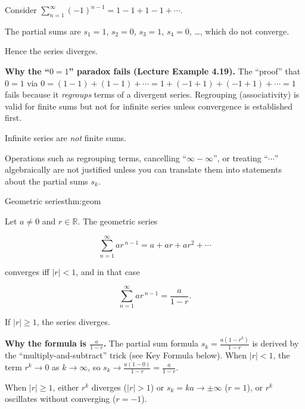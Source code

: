 \begin{examplebox}[title={Worked Example: a divergent series with oscillating partial sums}]

Consider $\displaystyle \sum_{n=1}^{\infty}(-1)^{n-1}=1-1+1-1+\cdots$.

The partial sums are $s_1=1$, $s_2=0$, $s_3=1$, $s_4=0$, \dots, which do not converge.

Hence the series diverges.

\end{examplebox}

\noindent
\textbf{Why the ``$0=1$'' paradox fails (Lecture Example 4.19).}
The ``proof'' that $0=1$ via $0=(1-1)+(1-1)+\cdots = 1+(-1+1)+(-1+1)+\cdots=1$ fails because it \emph{regroups} terms of a divergent series. Regrouping (associativity) is valid for finite sums but not for infinite series unless convergence is established first.

\begin{commonmistake}

Infinite series are \emph{not} finite sums.

Operations such as regrouping terms, cancelling ``$\infty-\infty$'', or treating ``$\cdots$'' algebraically are not justified unless you can translate them into statements about the partial sums $s_k$.

\end{commonmistake}

\begin{theorem}{Geometric series}{thm:geom}

Let $a\ne 0$ and $r\in\mathbb{R}$. The geometric series

\[
\sum_{n=1}^{\infty} a r^{\,n-1}=a+ar+ar^2+\cdots
\]

converges iff $|r|<1$, and in that case

\[
\sum_{n=1}^{\infty} a r^{\,n-1}=\frac{a}{1-r}.
\]

If $|r|\ge 1$, the series diverges.

\end{theorem}

\noindent
\textbf{Why the formula is $\frac{a}{1-r}$.}
The partial sum formula $s_k=\frac{a(1-r^k)}{1-r}$ is derived by the ``multiply-and-subtract'' trick (see Key Formula below). When $|r|<1$, the term $r^k\to 0$ as $k\to\infty$, so $s_k\to \frac{a(1-0)}{1-r}=\frac{a}{1-r}$.

When $|r|\ge 1$, either $r^k$ diverges ($|r|>1$) or $s_k=ka\to\pm\infty$ ($r=1$), or $r^k$ oscillates without converging ($r=-1$).

